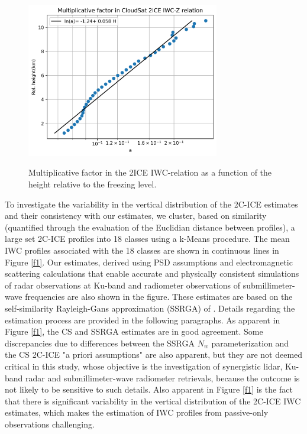 \documentclass{ametsocV6.1}
\begin{document}
\begin{figure}[t]
    \centering
    \includegraphics[width=0.75\textwidth,angle=0]{fig02.rev.png}\\
    \caption{Multiplicative factor in the 2ICE IWC-relation as a function of the height relative to the freezing level.}\label{f2}
\end{figure}

To investigate the variability in the vertical distribution of the 2C-ICE estimates and their consistency with our estimates, 
we cluster, based on similarity  (quantified through the evaluation of the Euclidian distance between profiles), a large set 2C-ICE profiles into 18 classes using a k-Means procedure. The mean IWC profiles associated with the 18 classes are shown in continuous lines in Figure \ref{f1}.  Our estimates, derived using PSD assumptions and electromagnetic scattering calculations that enable accurate and physically consistent simulations of radar observations at Ku-band and radiometer observations of submillimeter-wave frequencies are also shown in the figure. These estimates are based on the self-similarity Rayleigh-Gans approximation (SSRGA) of \cite{hogan2017ssrga}. Details regarding the estimation process are provided in the following paragraphs.  As apparent in Figure \ref{f1}, the CS and SSRGA estimates are in good agreement.  Some discrepancies due to differences between the SSRGA $N_w$ parameterization and the CS 2C-ICE "a priori assumptions" are also apparent, but they are not deemed critical in this study, whose objective is the investigation of synergistic lidar, Ku-band radar and submillimeter-wave radiometer retrievals, because the outcome is not likely to be sensitive to such details. Also apparent in Figure \ref{f1} is the fact that there is significant variability in the vertical distribution of the 2C-ICE IWC estimates, which makes the estimation of IWC profiles from passive-only observations challenging.  
\end{document}
